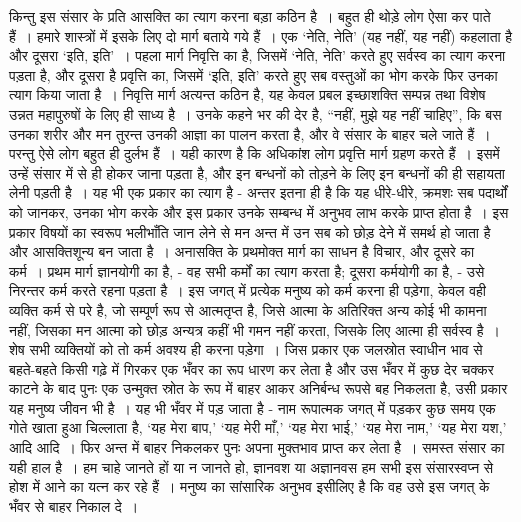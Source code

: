 किन्तु इस संसार के प्रति आसक्ति का त्याग करना बड़ा कठिन है~। बहुत ही थोड़े लोग ऐसा कर पाते हैं~। हमारे शास्त्रों में इसके लिए दो मार्ग बताये गये हैं~। एक ‘नेति, नेति’ (यह नहीं, यह नहीं) कहलाता है और दूसरा ‘इति, इति’~। पहला मार्ग निवृत्ति का है, जिसमें ‘नेति, नेति’ करते हुए सर्वस्व का त्याग करना पड़ता है, और दूसरा है प्रवृत्ति का, जिसमें ‘इति, इति’ करते हुए सब वस्तुओं का भोग करके फिर उनका त्याग किया जाता है~। निवृत्ति मार्ग अत्यन्त कठिन है, यह केवल प्रबल इच्छाशक्ति सम्पन्न तथा विशेष उन्नत महापुरुषों के लिए ही साध्य है~। उनके कहने भर की देर है, “नहीं, मुझे यह नहीं चाहिए”, कि बस उनका शरीर और मन तुरन्त उनकी आज्ञा का पालन करता है, और वे संसार के बाहर चले जाते हैं~। परन्तु ऐसे लोग बहुत ही दुर्लभ हैं~। यही कारण है कि अधिकांश लोग प्रवृत्ति मार्ग ग्रहण करते हैं~। इसमें उन्हें संसार में से ही होकर जाना पड़ता है, और इन बन्धनों को तोड़ने के लिए इन बन्धनों की ही सहायता लेनी पड़ती है~। यह भी एक प्रकार का त्याग है - अन्तर इतना ही है कि यह धीरे-धीरे, क्रमशः सब पदार्थों को जानकर, उनका भोग करके और इस प्रकार उनके सम्बन्ध में अनुभव लाभ करके प्राप्त होता है~। इस प्रकार विषयों का स्वरूप भलीभाँति जान लेने से मन अन्त में उन सब को छोड़ देने में समर्थ हो जाता है और आसक्तिशून्य बन जाता है~। अनासक्ति के प्रथमोक्त मार्ग का साधन है विचार, और दूसरे का कर्म~। प्रथम मार्ग ज्ञानयोगी का है, - वह सभी कर्मों का त्याग करता है; दूसरा कर्मयोगी का है, - उसे निरन्तर कर्म करते रहना पड़ता है~। इस जगत् में प्रत्येक मनुष्य को कर्म करना ही पड़ेगा, केवल वही व्यक्ति कर्म से परे है, जो सम्पूर्ण रूप से आत्मतृप्त है, जिसे आत्मा के अतिरिक्त अन्य कोई भी कामना नहीं, जिसका मन आत्मा को छोड़ अन्यत्र कहीं भी गमन नहीं करता, जिसके लिए आत्मा ही सर्वस्व है~। शेष सभी व्यक्तियों को तो कर्म अवश्य ही करना पड़ेगा~। जिस प्रकार एक जलस्रोत स्वाधीन भाव से बहते-बहते किसी गढ़े में गिरकर एक भँवर का रूप धारण कर लेता है और उस भँवर में कुछ देर चक्कर काटने के बाद पुनः एक उन्मुक्त स्रोत के रूप में बाहर आकर अनिर्बन्ध रूपसे बह निकलता है, उसी प्रकार यह मनुष्य जीवन भी है~। यह भी भँवर में पड़ जाता है - नाम रूपात्मक जगत् में पड़कर कुछ समय एक गोते खाता हुआ चिल्लाता है, ‘यह मेरा बाप,’ ‘यह मेरी माँ,’ ‘यह मेरा भाई,’ ‘यह मेरा नाम,’ ‘यह मेरा यश,’ आदि आदि~। फिर अन्त में बाहर निकलकर पुनः अपना मुक्तभाव प्राप्त कर लेता है~। समस्त संसार का यही हाल है~। हम चाहे जानते हों या न जानते हो, ज्ञानवश या अज्ञानवस हम सभी इस संसारस्वप्न से होश में आने का यत्न कर रहे हैं~। मनुष्य का सांसारिक अनुभव इसीलिए है कि वह उसे इस जगत् के भँवर से बाहर निकाल दे~।

